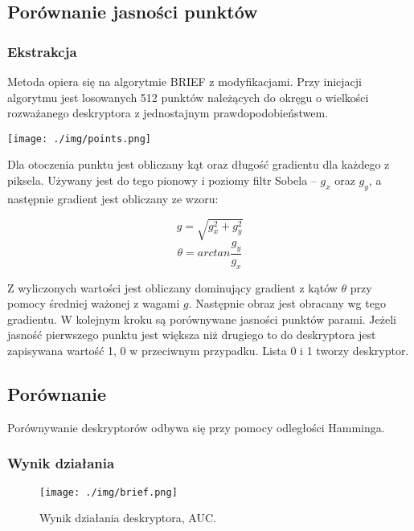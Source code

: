 \documentclass[a4paper,11pt]{article}
\begin{document}
\subsection{Porównanie jasności punktów}
\subsubsection{Ekstrakcja}
Metoda opiera się na algorytmie BRIEF z modyfikacjami. Przy inicjacji algorytmu jest losowanych 512 punktów należących do okręgu o wielkości rozważanego deskryptora z jednostajnym prawdopodobieństwem.

\texttt{[image: ./img/points.png]}

Dla otoczenia punktu jest obliczany kąt oraz długość gradientu dla każdego z piksela. Używany jest do tego pionowy i poziomy filtr Sobela -- $g_x$ oraz $g_y$, a następnie gradient jest obliczany ze wzoru:

$$ g = \sqrt{g_x^2 + g_y^2}$$
$$ \theta =arctan \frac{g_y}{g_x}$$

Z wyliczonych wartości jest obliczany dominujący gradient z kątów $\theta$ przy pomocy średniej ważonej z wagami $g$. Następnie obraz jest obracany wg tego gradientu. W kolejnym kroku są porównywane jasności punktów parami. Jeżeli jasność pierwszego punktu jest większa niż drugiego to do deskryptora jest zapisywana wartość 1, 0 w przeciwnym przypadku. Lista 0 i 1 tworzy deskryptor.


\subsection{Porównanie}
Porównywanie deskryptorów odbywa się przy pomocy odległości Hamminga.

\subsubsection{Wynik działania}

\begin{figure}[H]
\begin{center}
\texttt{[image: ./img/brief.png]}
\end{center}
\caption{Wynik działania deskryptora, AUC.}
\end{figure}
\end{document}
